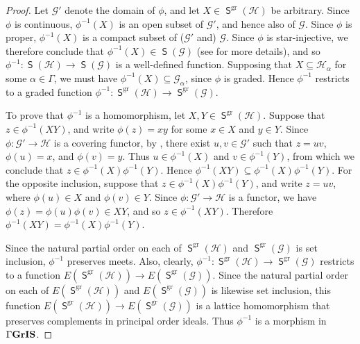 \documentclass[a4paper,reqno,12pt]{amsart}
\numberwithin{equation}{section}
\theoremstyle{plain}
\theoremstyle{definition}
\newcommand{\gr}{\operatorname{gr}}
\newcommand{\GIS}{\operatorname{\Gamma\bf{GrIS}}}
\newcommand{\SG}{\operatorname{\mathsf{S}}}
\begin{document}
\begin{proof}
Let $\mathscr{G}'$ denote the domain of $\phi$, and let $X \in \SG^{\gr}(\mathscr{H})$ be arbitrary. Since $\phi$ is continuous, $\phi^{-1}(X)$ is an open subset of $\mathscr{G}'$, and hence also of $\mathscr{G}$. Since $\phi$ is proper, $\phi^{-1}(X)$ is a compact subset of ($\mathscr{G}'$ and) $\mathscr{G}$. Since $\phi$ is star-injective, we therefore conclude that $\phi^{-1}(X) \in \SG(\mathscr{G})$ (see \cite[Proposition 2.17]{Lawson2} for more details), and so $\phi^{-1} : \SG(\mathscr{H}) \to \SG(\mathscr{G})$ is a well-defined function. Supposing that $X \subseteq \mathscr{H}_{\alpha}$ for some $\alpha \in \Gamma$, we must have $\phi^{-1}(X) \subseteq \mathscr{G}_{\alpha}$, since $\phi$ is graded. Hence $\phi^{-1}$ restricts to a graded function $\phi^{-1} : \SG^{\gr}(\mathscr{H}) \to \SG^{\gr}(\mathscr{G})$.

To prove that $\phi^{-1}$ is a homomorphism, let $X,Y \in \SG^{\gr}(\mathscr{H})$. Suppose that $z \in \phi^{-1}(XY)$, and write $\phi(z)=xy$ for some $x \in X$ and $y \in Y$. Since $\phi: \mathscr{G}' \to \mathscr{H}$ is a covering functor, by \cite[Lemma 2.16]{Lawson2}, there exist $u,v \in \mathscr{G}'$ such that $z = uv$, $\phi(u) = x$, and $\phi(v) = y$. Thus $u \in \phi^{-1}(X)$ and $v \in \phi^{-1}(Y)$, from which we conclude that $z \in \phi^{-1}(X)\phi^{-1}(Y)$. Hence $\phi^{-1}(XY) \subseteq \phi^{-1}(X)\phi^{-1}(Y)$. For the opposite inclusion, suppose that $z \in \phi^{-1}(X)\phi^{-1}(Y)$, and write $z = uv$, where $\phi(u) \in X$ and $\phi(v) \in Y$. Since $\phi: \mathscr{G}' \to \mathscr{H}$ is a functor, we have $\phi(z) =\phi(u)\phi(v) \in XY$, and so $z \in  \phi^{-1}(XY)$. Therefore $\phi^{-1}(XY) = \phi^{-1}(X)\phi^{-1}(Y)$.

Since the natural partial order on each of $\SG^{\gr}(\mathscr{H})$ and $\SG^{\gr}(\mathscr{G})$ is set inclusion, $\phi^{-1}$ preserves meets. Also, clearly, $\phi^{-1} : \SG^{\gr}(\mathscr{H}) \to \SG^{\gr}(\mathscr{G})$ restricts to a function $E(\SG^{\gr}(\mathscr{H})) \to E(\SG^{\gr}(\mathscr{G}))$. Since the natural partial order on each of  $E(\SG^{\gr}(\mathscr{H}))$ and $E(\SG^{\gr}(\mathscr{G}))$ is likewise set inclusion, this function $E(\SG^{\gr}(\mathscr{H})) \to E(\SG^{\gr}(\mathscr{G}))$ is a lattice homomorphism   that preserves complements in principal order ideals. Thus $\phi^{-1}$ is a morphism in $\GIS$.


\end{proof}
\end{document}
